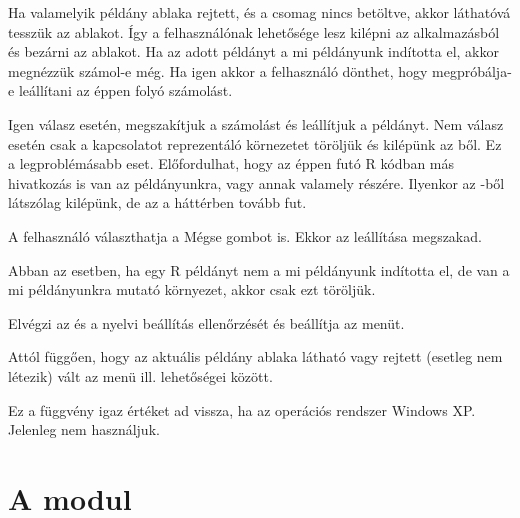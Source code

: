\begin{description}
  Ha valamelyik  példány ablaka rejtett, és a  csomag
  nincs betöltve, 
  akkor láthatóvá tesszük az ablakot. Így a felhasználónak lehetősége
  lesz kilépni az  alkalmazásból és bezárni az ablakot.  Ha az
  adott  példányt a mi  példányunk indította el,
  akkor megnézzük 
  számol-e még. Ha igen akkor a felhasználó dönthet, hogy
  megpróbálja-e leállítani az éppen folyó számolást.  
  
  Igen válasz
  esetén, megszakítjuk a számolást és leállítjuk a  példányt.  Nem
  válasz esetén csak a kapcsolatot reprezentáló körnezetet töröljük
  és kilépünk az ből. Ez a legproblémásabb
  eset. Előfordulhat, hogy az éppen futó R kódban más hivatkozás
  is van az 
   példányunkra, vagy annak valamely részére. Ilyenkor az
  -ből látszólag kilépünk, de az a háttérben tovább fut. 

  A  felhasználó választhatja a Mégse gombot is. Ekkor az 
  leállítása megszakad.  

  Abban az esetben, ha egy R példányt nem a mi
   példányunk indította el,  de van a mi 
  példányunkra mutató környezet, akkor csak ezt töröljük.
\item[\code{Workbook\_Open}] Elvégzi az  és a nyelvi
  beállítás ellenőrzését és 
  beállítja az  menüt.
\item[\code{Rmenuset}] Attól függően, hogy az aktuális 
  példány ablaka látható vagy rejtett (esetleg nem létezik) vált az
   menü  ill.  lehetőségei 
  között.
\item[\code{isXP}] Ez a függvény igaz értéket ad vissza, ha az operációs
  rendszer Windows XP. Jelenleg nem használjuk.
\end{description}
\section{A  modul}\label{sec:5.2}

